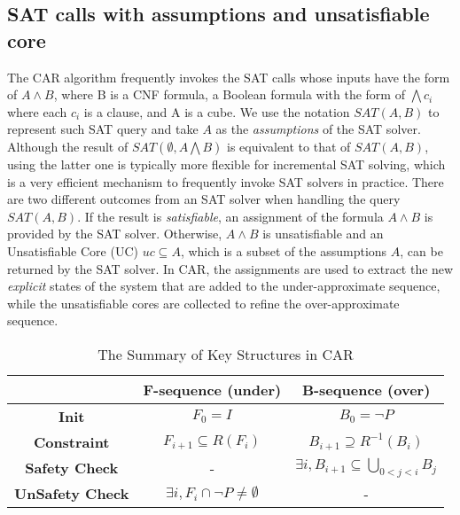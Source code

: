 \subsection{SAT calls with assumptions and unsatisfiable core}
The CAR algorithm frequently invokes the SAT calls whose inputs have the form of $A\wedge B$, where B is a CNF formula, a Boolean formula with the form of $\bigwedge c_i$ where each $c_i$ is a clause, and A is a cube. We use the notation $SAT(A, B)$ to represent such SAT query and take $A$ as the \emph{assumptions} of the SAT solver. Although the result of $SAT(\emptyset,A \bigwedge B)$ is equivalent to that of $SAT(A,B)$, using the latter one is typically more flexible for incremental SAT solving, which is a very efficient mechanism to frequently invoke SAT solvers in practice.   
There are two different outcomes from an SAT solver when handling the query $SAT (A, B)$. If the result is \emph{satisfiable}, an assignment of the formula $A\wedge B$ is provided by the SAT solver. Otherwise, $A\wedge B$ is unsatisfiable and an Unsatisfiable Core (UC) $uc\subseteq A$, which is a subset of the assumptions $A$, can be returned by the SAT solver. In CAR, the assignments are used to extract the new \emph{explicit} states of the system that are added to the under-approximate sequence, while the unsatisfiable cores are collected to refine the over-approximate sequence. 


\begin{table}
\caption{The Summary of Key Structures in CAR}\label{tab:car}
\begin{tabular}{|c|c|c|} %
\hline 
&\textbf{F-sequence (under)}&\textbf{B-sequence (over)}\\
\hline  
\textbf{Init}&$F_{0}=I$&$B_{0}=\neg P$\\
\hline
\textbf{Constraint}&$F_{i+1}\subseteq R(F_{i})$&$B_{i+1}\supseteq R^{-1}(B_{i})$ \\
\hline
\textbf{Safety Check}&-&$\exists i, B_{i+1}\subseteq \bigcup_{0<j<i}B_{j}$ \\
\hline
\textbf{UnSafety Check}&$\exists i,F_{i}\cap \neg P \neq \emptyset$&- \\
\hline
\end{tabular}
\end{table}


